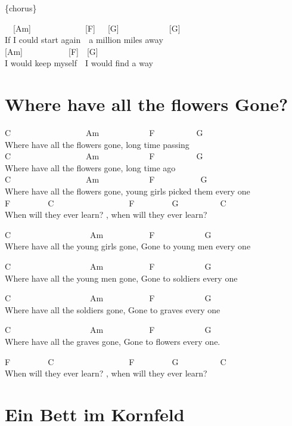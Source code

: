 \documentclass[
  letterpaper,
  twoside=false]{scrbook}
\begin{document}
\{chorus\}

~~{[}Am{]}~~~~~~~~~~~~~{[}F{]}~~~{[}G{]}~~~~~~~~~~~~{[}G{]}\\
If I could start again~~a million miles away\\
{[}Am{]}~~~~~~~~~~~{[}F{]}~~{[}G{]}\\
I would keep myself~~I would find a way

\hypertarget{where-have-all-the-flowers-gone}{%
\chapter{Where have all the flowers
Gone?}\label{where-have-all-the-flowers-gone}}

C~~~~~~~~~~~~~~~~~~Am~~~~~~~~~~~~F~~~~~~~~~~G\\
Where have all the flowers gone, long time passing\\
C~~~~~~~~~~~~~~~~~~Am~~~~~~~~~~~~F~~~~~~~~~~G\\
Where have all the flowers gone, long time ago\\
C~~~~~~~~~~~~~~~~~~Am~~~~~~~~~~~~F~~~~~~~~~~~G\\
Where have all the flowers gone, young girls picked them every one\\
F~~~~~~~~~C~~~~~~~~~~~~~~~~~~F~~~~~~~~~G~~~~~~~~~~C~~~\\
When will they ever learn? , when will they ever learn?

C~~~~~~~~~~~~~~~~~~~Am~~~~~~~~~~~F~~~~~~~~~~~~G\\
Where have all the young girls gone, Gone to young men every one

C~~~~~~~~~~~~~~~~~~~Am~~~~~~~~~~~F~~~~~~~~~~~~G\\
Where have all the young men gone, Gone to soldiers every one

C~~~~~~~~~~~~~~~~~~~Am~~~~~~~~~~~F~~~~~~~~~~~~G~~~\\
Where have all the soldiers gone, Gone to graves every one

C~~~~~~~~~~~~~~~~~~~Am~~~~~~~~~~~F~~~~~~~~~~~~G~~\\
Where have all the graves gone, Gone to flowers every one.

F~~~~~~~~~C~~~~~~~~~~~~~~~~~~F~~~~~~~~~G~~~~~~~~~~C\\
When will they ever learn? , when will they ever learn?

\hypertarget{ein-bett-im-kornfeld}{%
\chapter{Ein Bett im Kornfeld}\label{ein-bett-im-kornfeld}}
\end{document}
